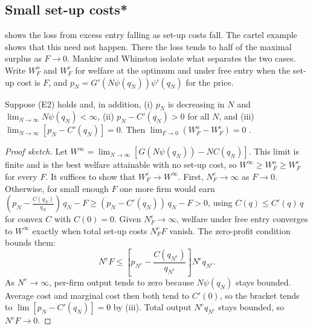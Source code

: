\subsection{Small set-up costs*}\label{sec:02-small-F}

 shows the loss from excess entry falling as set-up costs fall. The cartel example shows that this
need not happen. There the loss tends to half of the maximal surplus as $F \to 0$. Mankiw and Whinston isolate what
separates the two cases. Write $W^o_F$ and $W^e_F$ for welfare at the optimum and under free entry when the set-up
cost is $F$, and $p_N = G'\left(N\psi(q_N)\right)\psi'(q_N)$ for the price.

\begin{proposition}\label{prop:02-mw-small}
Suppose (E2) holds and, in addition, (i) $p_N$ is decreasing in $N$ and $\lim_{N\to\infty} N\psi(q_N) < \infty$,
(ii) $p_N - C'(q_N) > 0$ for all $N$, and (iii) $\lim_{N\to\infty}\left[p_N - C'(q_N)\right] = 0$. Then
$\lim_{F\to 0}\left(W^o_F - W^e_F\right) = 0$ \citep[Proposition~3]{MankiwWhinston1986}.
\end{proposition}

\begin{proof}[Proof sketch]
Let $W^\infty = \lim_{N\to\infty}\left[G\left(N\psi(q_N)\right) - N C(q_N)\right]$. This limit is finite and is the
best welfare attainable with no set-up cost, so $W^\infty \ge W^o_F \ge W^e_F$ for every $F$. It suffices to show
that $W^e_F \to W^\infty$. First, $N^e_F \to \infty$ as $F \to 0$. Otherwise, for small enough $F$ one more firm
would earn $(p_N - \frac{C(q_N)}{q_N})\, q_N - F \ge (p_N - C'(q_N))\, q_N - F > 0$, using $C(q) \le C'(q)\, q$ for
convex $C$ with $C(0) = 0$. Given $N^e_F \to \infty$, welfare under free entry converges to $W^\infty$ exactly when
total set-up costs $N^e_F F$ vanish. The zero-profit condition bounds them:
\begin{equation*}
N^e F \le \left[p_{N^e} - \frac{C(q_{N^e})}{q_{N^e}}\right] N^e q_{N^e} .
\end{equation*}
As $N^e \to \infty$, per-firm output tends to zero because $N\psi(q_N)$ stays bounded. Average cost and marginal cost
then both tend to $C'(0)$, so the bracket tends to $\lim\left[p_N - C'(q_N)\right] = 0$ by (iii). Total output
$N^e q_{N^e}$ stays bounded, so $N^e F \to 0$.
\end{proof}

